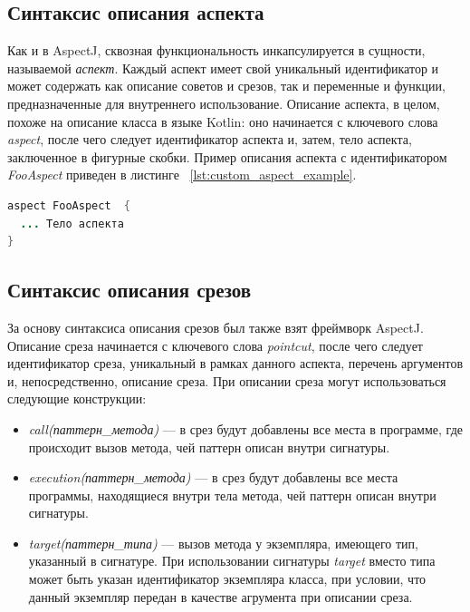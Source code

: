 \subsection{Синтаксис описания аспекта}
\label{sub:custom_aspect_syntax}
Как и в AspectJ, сквозная функциональность инкапсулируется в сущности,
называемой \textit{аспект}.
Каждый аспект имеет свой уникальный идентификатор и может содержать как описание
советов и срезов, так и переменные и функции, предназначенные для внутреннего
использование.
Описание аспекта, в целом, похоже на описание класса в языке Kotlin: оно
начинается с ключевого слова \textit{aspect}, после чего следует идентификатор
аспекта и, затем, тело аспекта, заключенное в фигурные скобки.
Пример описания аспекта с идентификатором \textit{FooAspect} приведен в листинге
~\ref{lst:custom_aspect_example}.
  \begin{lstlisting}[language=Java, label={lst:custom_aspect_example}, 
  caption={Пример описания аспекта в разрабатываемом прототипе}]
aspect FooAspect  {
  ... Тело аспекта
}
  \end{lstlisting}
\subsection{Синтаксис описания срезов}
\label{sub:custom_pointcut_syntax}
За основу синтаксиса описания срезов был также взят фреймворк AspectJ.
Описание среза начинается с ключевого слова \textit{pointcut}, после чего
следует идентификатор среза, уникальный в рамках данного аспекта, перечень
аргументов и, непосредственно, описание среза.
При описании среза могут использоваться следующие конструкции:
\begin{itemize}
	\item \textit{call(паттерн\_метода)} --- в срез будут добавлены все места в
		  программе, где происходит вызов метода, чей паттерн описан внутри
	  	сигнатуры.
	\item \textit{execution(паттерн\_метода)} --- в срез будут добавлены все
		  места программы, находящиеся внутри тела метода, чей паттерн описан внутри
		  сигнатуры.
	\item \textit{target(паттерн\_типа)} --- вызов метода у экземпляра, имеющего
		  тип, указанный в сигнатуре.
		  При использовании сигнатуры \textit{target} вместо типа может быть указан
		  идентификатор экземпляра класса, при условии, что данный экземпляр передан
		  в качестве агрумента при описании среза.
\end{itemize}

